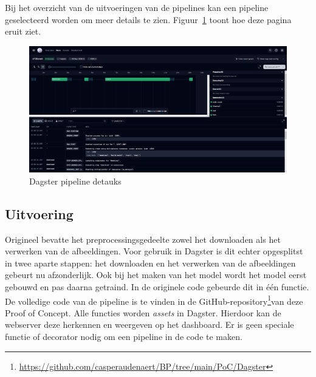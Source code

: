 Bij het overzicht van de uitvoeringen van de pipelines kan een pipeline geselecteerd worden om meer details te zien. Figuur~\ref{fig:Dagser_details} toont hoe deze pagina eruit ziet.
\begin{figure}[h]
    \centering
    \includegraphics[width=0.9\linewidth]{graphics/Dagster_Flow.PNG}
    \caption{Dagster pipeline detauks}
    \label{fig:Dagser_details}
\end{figure}
\subsection{Uitvoering}
Origineel bevatte het preprocessingsgedeelte zowel het downloaden als het verwerken van de afbeeldingen. Voor gebruik in Dagster is dit echter opgesplitst in twee aparte stappen: het downloaden en het verwerken van de afbeeldingen gebeurt nu afzonderlijk. Ook bij het maken van het model wordt het model eerst gebouwd en pas daarna getraind. In de originele code gebeurde dit in één functie.
De volledige code van de pipeline is te vinden in de GitHub-repository\footnote{\url{https://github.com/casperaudenaert/BP/tree/main/PoC/Dagster}}van deze Proof of Concept.
Alle functies worden \textit{assets} in Dagster. Hierdoor kan de webserver deze herkennen en weergeven op het dashboard. Er is geen speciale functie of decorator nodig om een pipeline in de code te maken.
